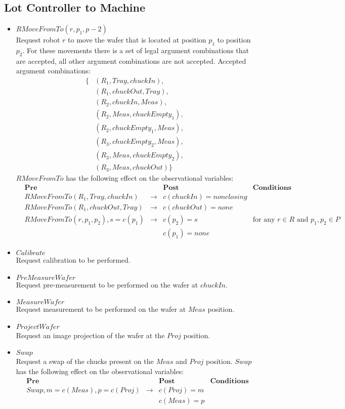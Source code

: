 \subsection{Lot Controller to Machine}
\begin{itemize}
\item $RMoveFromTo(r, p_1, p-2)$
\\Request robot $r$ to move the wafer that is located at position $p_1$ to position $p_2$. For these movements there is a set of legal argument combinations that are accepted, all other argument combinations are not accepted. Accepted argument combinations: 
\begin{align*}
\{ & (R_1, Tray, chuckIn),&\\
& (R_1, chuckOut, Tray),&\\
&(R_2, chuckIn, Meas),&\\
&(R_2, Meas, chuckEmpty_1),&\\
&(R_2, chuckEmpty_1, Meas),&\\
&(R_3, chuckEmpty_2, Meas),&\\
&(R_3, Meas, chuckEmpty_2),&\\
&(R_3, Meas, chuckOut)\}
\end{align*}
$RMoveFromTo$ has the following effect on the observational variables: 
\begin{align*}
&\textbf{Pre}&&\textbf{Post}&\textbf{Conditions}&\\
&RMoveFromTo(R_1, Tray, chuckIn)&\rightarrow&c(chuckIn) = nonclosing&&\\
&RMoveFromTo(R_1, chuckOut, Tray)&\rightarrow&c(chuckOut) = none&&\\
&RMoveFromTo(r, p_1, p_2), s = c(p_1)&\rightarrow&c(p_2) = s&\text{for any }r \in R\text{ and }p_1,p_2 \in P&\\
&&&c(p_1)=none&&
\end{align*}
\item $Calibrate$
\\Request calibration to be performed.
\item $PreMeasureWafer$
\\Request pre-measurement to be performed on the wafer at $chuckIn$.
\item $MeasureWafer$
\\Request measurement to be performed on the wafer at $Meas$ position.
\item $ProjectWafer$
\\Request an image projection of the wafer at the $Proj$ position.
\item $Swap$
\\Request a swap of the chucks present on the $Meas$ and $Proj$ position.
$Swap$ has the following effect on the observational variables:
\begin{align*}
&\textbf{Pre}&&\textbf{Post}&\textbf{Conditions}&\\
&Swap, m = c(Meas), p = c(Proj)&\rightarrow&c(Proj) = m&&\\
&&&c(Meas) = p&&
\end{align*}
\end{itemize}

